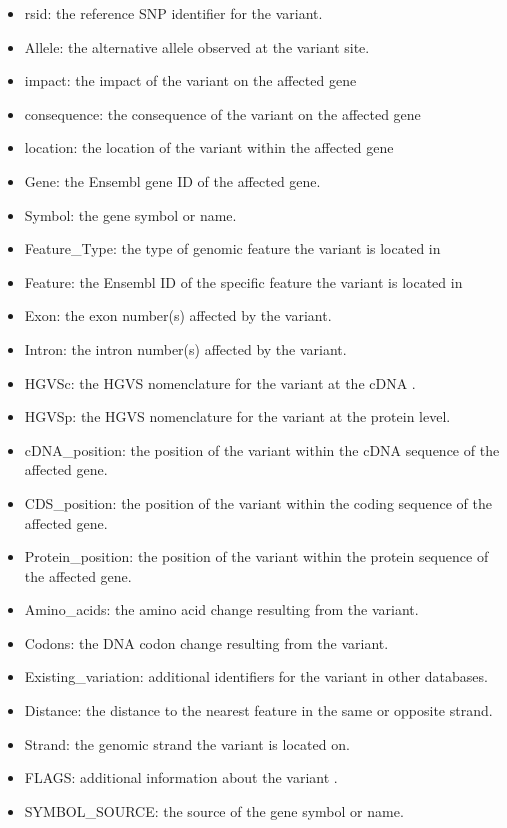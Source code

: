 \documentclass[12pt,a4paper]{article}
\begin{document}
\begin{itemize}

\item rsid: the reference SNP identifier for the variant.
\item Allele: the alternative allele observed at the variant site.
\item impact: the impact of the variant on the affected gene
\item consequence: the consequence of the variant on the affected gene
\item location: the location of the variant within the affected gene
\item Gene: the Ensembl gene ID of the affected gene.
\item Symbol: the gene symbol or name.
\item Feature\_Type: the type of genomic feature the variant is located in
\item Feature: the Ensembl ID of the specific feature the variant is located in
\item Exon: the exon number(s) affected by the variant.
\item Intron: the intron number(s) affected by the variant.
\item HGVSc: the HGVS nomenclature for the variant at the cDNA .
\item HGVSp: the HGVS nomenclature for the variant at the protein level.
\item cDNA\_position: the position of the variant within the cDNA sequence of the affected gene.
\item CDS\_position: the position of the variant within the coding sequence of the affected gene.
\item Protein\_position: the position of the variant within the protein sequence of the affected gene.
\item Amino\_acids: the amino acid change resulting from the variant.
\item Codons: the DNA codon change resulting from the variant.
\item Existing\_variation: additional identifiers for the variant in other databases.
\item Distance: the distance to the nearest feature in the same or opposite strand.
\item Strand: the genomic strand the variant is located on.
\item FLAGS: additional information about the variant .
\item SYMBOL\_SOURCE: the source of the gene symbol or name.

\end{itemize}
\end{document}
